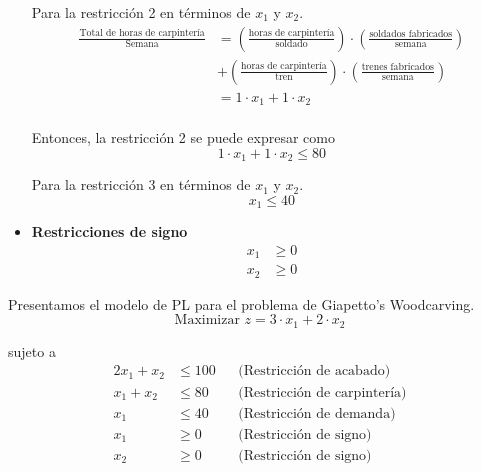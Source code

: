 \documentclass[../main.tex]{subfiles}
\begin{document}
\begin{example}
\begin{itemize}
                Para la restricción 2 en términos de $x_1$ y $x_2$.
                \begin{equation}
                    \begin{split}
                        \frac{\text{Total de horas de carpintería}}{\text{Semana}} &= \left(\frac{\text{horas de carpintería}}{\text{soldado}}\right) \cdot \left(\frac{\text{soldados fabricados}}{\text{semana}}\right) \\ & + \left(\frac{\text{horas de carpintería}}{\text{tren}}\right) \cdot \left(\frac{\text{trenes fabricados}}{\text{semana}}\right)  \\
                        &= 1 \cdot x_1 + 1 \cdot x_2 \\
                    \end{split}
                \end{equation}

                Entonces, la restricción 2 se puede expresar como
                \begin{equation}
                    1 \cdot x_1 + 1 \cdot x_2 \leq 80
                \end{equation}

                Para la restricción 3 en términos de $x_1$ y $x_2$.
                \begin{equation}
                    x_1 \leq 40
                \end{equation}

            \item \textbf{Restricciones de signo}
                \begin{equation}
                    \begin{split}
                        x_1 &\geq 0 \\
                        x_2 &\geq 0
                    \end{split}
                \end{equation}
            \label{item:ejemplo_giapetto}
        \end{itemize}

        Presentamos el modelo de PL para el problema de Giapetto's Woodcarving.
        \begin{equation}
            \text{Maximizar } z =  3 \cdot x_1 + 2 \cdot x_2
        \end{equation}

        sujeto a
        \begin{equation}
            \begin{aligned}
            2x_1 + x_2 &\leq 100 && \text{(Restricción de acabado)}\\
            x_1 + x_2 &\leq 80 && \text{(Restricción de carpintería)}\\
            x_1 &\leq 40 && \text{(Restricción de demanda)}\\
            x_1 &\geq 0 && \text{(Restricción de signo)}\\
            x_2 &\geq 0 && \text{(Restricción de signo)}
            \end{aligned}
        \end{equation}


\end{example}
\end{document}
